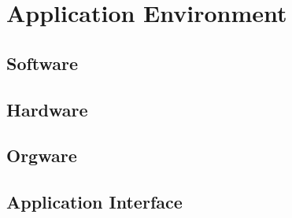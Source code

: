 \chapter{Application Environment}
\label{ch:environment}

\section{Software}
\section{Hardware}
\section{Orgware}
\section{Application Interface}